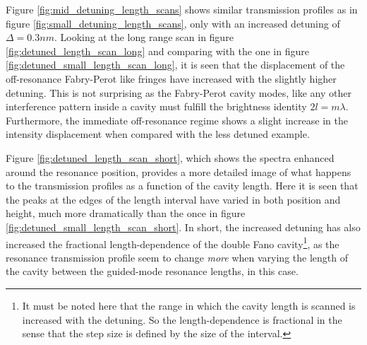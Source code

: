 Figure \ref{fig:mid_detuning_length_scans} shows similar transmission profiles as in figure \ref{fig:small_detuning_length_scans}, only with an increased detuning of $\Delta = 0.3nm$. Looking at the long range scan in figure {\ref{fig:detuned_length_scan_long}} and comparing with the one in figure \ref{fig:detuned_small_length_scan_long}, it is seen that the displacement of the off-resonance Fabry-Perot like fringes have increased with the slightly higher detuning. This is not surprising as the Fabry-Perot cavity modes, like any other interference pattern inside a cavity must fulfill the brightness identity $2l = m \lambda$. Furthermore, the immediate off-resonance regime shows a slight increase in the intensity displacement when compared with the less detuned example. 

Figure \ref{fig:detuned_length_scan_short}, which shows the spectra enhanced around the resonance position, provides a more detailed image of what happens to the transmission profiles as a function of the cavity length. Here it is seen that the peaks at the edges of the length interval have varied in both position and height, much more dramatically than the once in figure \ref{fig:detuned_small_length_scan_short}. In short, the increased detuning has also increased the fractional length-dependence of the double Fano cavity\footnote{It must be noted here that the range in which the cavity length is scanned is increased with the detuning. So the length-dependence is fractional in the sense that the step size is defined by the size of the interval.}, as the resonance transmission profile seem to change \emph{more} when varying the length of the cavity between the guided-mode resonance lengths, in this case.

